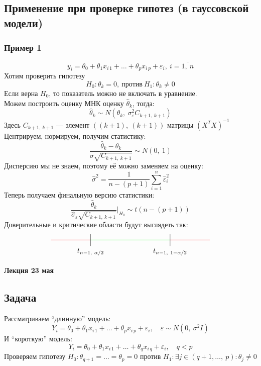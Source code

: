 \documentclass[12pt, a4paper]{article}
\begin{document}
\subsection*{Применение при проверке гипотез (в гауссовской модели)}
\subsubsection*{Пример 1}
\[
y_i = \theta_0 + \theta_1 x_{i\, 1} + \dots + \theta_p x_{i\, p} + \varepsilon_i,\ i = \overline{1,\ n}
\]
Хотим проверить гипотезу
\[
H_0: \theta_k = 0,\ \text{против}\ H_1: \theta_k \neq 0
\]
Если верна $H_0$, то показатель можно не включать в уравнение.\\
Можем построить оценку МНК оценку $\hat \theta_k$, тогда:
\[
\hat \theta_k \sim N(\theta_k,\ \sigma^2_{\varepsilon} C_{k + 1,\ k + 1})
\]
Здесь $C_{k + 1,\ k + 1}$ --- элемент $\left( (k + 1),\ (k + 1) \right)$ матрицы $\left( X^T X \right)^{-1}$\\
Центрируем, нормируем, получим статистику:
\[
\frac{\hat \theta_k - \theta_k}{ \sigma \sqrt{C_{k + 1,\ k + 1}}} \sim N(0,\ 1)
\]
Дисперсию мы не знаем, поэтому её можно заменяем на оценку:
\[
\hat \sigma^2 = \frac{1}{n - (p + 1)} \sum_{i = 1}^{n} \hat \varepsilon_i^2
\]
Теперь получаем финальную версию статистики:
\[
\frac{\hat \theta_k}{\hat \sigma_{\varepsilon} \sqrt{C_{k + 1,\ k + 1}}} \Big|_{H_0} \sim t(n - (p + 1))
\]
Доверительные и критические области будут выглядеть так:
\[\begin{tikzpicture}[scale = 2]
    \draw[color=red] (-2, 0) -- (-1, 0);
    \draw[color=red] (1, 0) -- (2, 0);
    \draw[color=green] (-1, 0) -- (1, 0);
    \draw (1, -0.15) -- (1, 0.15);
    \draw (-1, -0.15) -- (-1, 0.15);
    \node at(-1, -0.3) (a) {$t_{n - 1,\ \alpha/2}$};
    \node at(1, -0.3) (a) {$t_{n - 1,\ 1 - \alpha/2}$};
\end{tikzpicture}\]

\begin{center}
    \bf Лекция 23 мая
\end{center}
\subsection*{Задача}
Рассматриваем ``длинную'' модель:
\[
Y_i = \theta_0 + \theta_1 x_{i\, 1} + \dots + \theta_p x_{i\, p} + \varepsilon_i,\quad \varepsilon \sim N(0,\ \sigma^2 I)
\]
И ``короткую'' модель:
\[
Y_i = \theta_0 + \theta_1 x_{i\, 1} + \dots + \theta_q x_{i\, q} + \varepsilon_i,\quad q < p
\]
Проверяем гипотезу $H_0: \theta_{q + 1} = \dots = \theta_p = 0$ против $H_1: \exists j \in (q + 1,\dots,\ p): \theta_j \neq 0$
\end{document}
